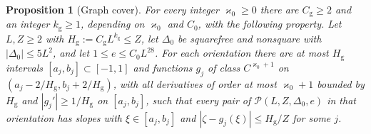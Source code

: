 \documentclass[11pt,reqno]{amsart}
\newtheorem{proposition}[theorem]{Proposition}
\theoremstyle{definition}
\theoremstyle{remark}
\numberwithin{equation}{section}
\begin{document}
\begin{proposition}[Graph cover]\label{prop:A3graph}
For every integer $\varkappa_0\ge0$ there are $C_{\mathrm g}\ge2$ and an
integer $k_{\mathrm g}\ge1$, depending on $\varkappa_0$ and $C_0$, with the
following property. Let $L,Z\ge2$ with
$H_{\mathrm g}:=C_{\mathrm g}L^{k_{\mathrm g}}\le Z$, let $\Delta_0$ be
squarefree and nonsquare with $|\Delta_0|\le5L^2$, and let
$1\le e\le C_0L^{28}$. For each orientation there are at most
$H_{\mathrm g}$ intervals $[a_j,b_j]\subset[-1,1]$ and functions $g_j$ of
class $C^{\varkappa_0+1}$ on
$(a_j-2/H_{\mathrm g},b_j+2/H_{\mathrm g})$, with all derivatives of order
at most $\varkappa_0+1$ bounded by $H_{\mathrm g}$ and
$|g_j'|\ge1/H_{\mathrm g}$ on $[a_j,b_j]$, such that every pair of
$\mathcal P(L,Z,\Delta_0,e)$ in that orientation has slopes with
$\xi\in[a_j,b_j]$ and $|\zeta-g_j(\xi)|\le H_{\mathrm g}/Z$ for some $j$.
\end{proposition}
\end{document}
